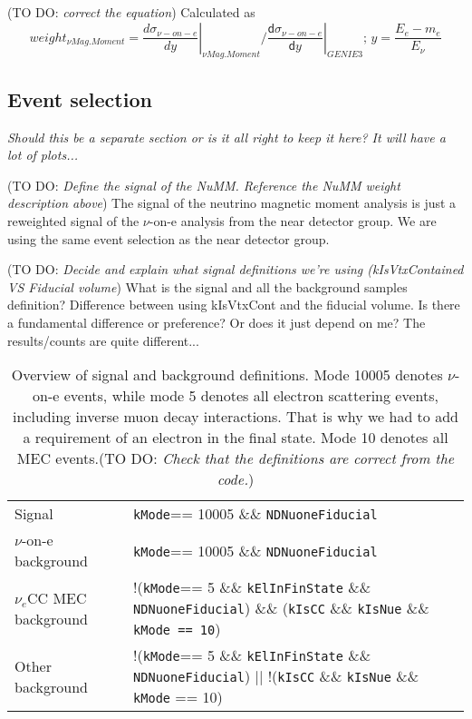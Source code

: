 \documentclass[12pt]{article}
\newcommand{\todo }[1]{({\color{red}\sc TO DO: \textit{#1}})}
\begin{document}
\todo{correct the equation}
Calculated as 
\begin{equation}
weight_{\nu Mag. Moment} = \left.\frac{d\sigma_{\nu-on-e}}{dy}\right|_{\nu Mag. Moment} / \left.\frac{\textsf{d}\sigma_{\nu-on-e}}{\textsf{d}y}\right|_{GENIE 3};\,y=\frac{E_e-m_e}{E_\nu}
\end{equation}

\subsection{Event selection}
\textit{Should this be a separate section or is it all right to keep it here? It will have a lot of plots...}

\todo{Define the signal of the NuMM. Reference the NuMM weight description above}
The signal of the neutrino magnetic moment analysis is just a reweighted signal of the $\nu$-on-e analysis from the near detector group. We are using the same event selection as the near detector group.

\todo{Decide and explain what signal definitions we're using (kIsVtxContained VS Fiducial volume}
What is the signal and all the background samples definition? Difference between using kIsVtxCont and the fiducial volume. Is there a fundamental difference or preference? Or does it just depend on me? The results/counts are quite different...

\begin{table}[!ht]
\centering
\def\arraystretch{1.4}
\begin{tabular}{p{}p{}}
Signal                   & \texttt{kMode}== 10005 \&\& \texttt{NDNuoneFiducial}\\
$\nu$-on-e background    & \texttt{kMode}== 10005 \&\& \texttt{NDNuoneFiducial}\\
$\nu_e$CC MEC background & !(\texttt{kMode}== 5 \&\& \texttt{kElInFinState} \&\& \texttt{NDNuoneFiducial}) \&\& (\texttt{kIsCC} \&\& \texttt{kIsNue} \&\& \texttt{kMode == 10})\\
Other background         & !(\texttt{kMode}== 5 \&\& \texttt{kElInFinState} \&\& \texttt{NDNuoneFiducial}) $||$ !(\texttt{kIsCC} \&\& \texttt{kIsNue} \&\& \texttt{kMode} == 10)
\end{tabular}
\caption{Overview of signal and background definitions. Mode 10005 denotes $\nu$-on-e events, while mode 5 denotes all electron scattering events, including inverse muon decay interactions. That is why we had to add a requirement of an electron in the final state. Mode 10 denotes all MEC events.\todo{Check that the definitions are correct from the code.}}
\label{tab:SignalDefinitions}
\end{table}
\end{document}
